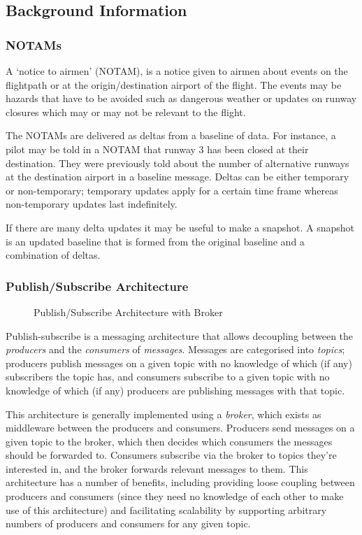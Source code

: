 \documentclass[a4paper, 12pt]{article}
\begin{document}
\subsection{Background Information}

\subsubsection{NOTAMs}
A `notice to airmen' (NOTAM), is a notice given to airmen about events on the flightpath or at the origin/destination airport of the flight. The events may be hazards that have to be avoided such as dangerous weather or updates on runway closures which may or may not be relevant to the flight.

The NOTAMs are delivered as deltas from a baseline of data. For instance, a pilot may be told in a NOTAM that runway 3 has been closed at their destination. They were previously told about the number of alternative runways at the destination airport in a baseline message. Deltas can be either temporary or non-temporary; temporary updates apply for a certain time frame whereas non-temporary updates last indefinitely.

If there are many delta updates it may be useful to make a snapshot. A snapshot is an updated baseline that is formed from the original baseline and a combination of deltas.

\newpage

\subsubsection{Publish/Subscribe Architecture}

\begin{figure}
\begin{center}
\def\svgwidth{\columnwidth}

\end{center}
\caption{Publish/Subscribe Architecture with Broker}
\label{fig:example_net}
\end{figure}

Publish-subscribe is a messaging architecture that allows decoupling between the \emph{producers} and the \emph{consumers} of \emph{messages}. Messages are categorised into \emph{topics}; producers publish messages on a given topic with no knowledge of which (if any) subscribers the topic has, and consumers subscribe to a given topic with no knowledge of which (if any) producers are publishing messages with that topic.

This architecture is generally implemented using a \emph{broker}, which exists as middleware between the producers and consumers. Producers send messages on a given topic to the broker, which then decides which consumers the messages should be forwarded to. Consumers subscribe via the broker to topics they’re interested in, and the broker forwards relevant messages to them. This architecture has a number of benefits, including providing loose coupling between producers and consumers (since they need no knowledge of each other to make use of this architecture) and facilitating scalability by supporting arbitrary numbers of producers and consumers for any given topic.
\end{document}
